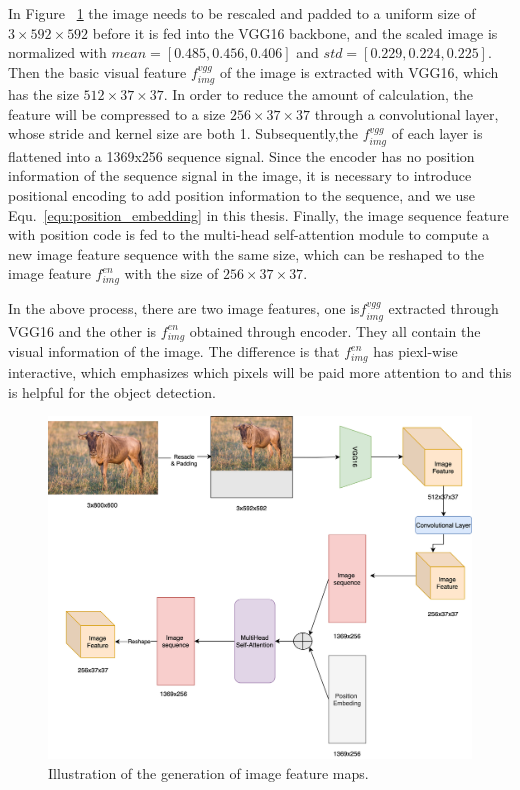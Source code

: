 In Figure ~\ref{fig:imgfeatbaseline} the image needs to be rescaled and padded to a uniform size of $ 3\times592\times592 $ before it is fed into the VGG16 backbone, and the scaled image is normalized with $ mean = [0.485, 0.456, 0.406 ]$ and $ std = [ 0.229, 0.224, 0.225]$. Then the basic visual feature $f^{vgg}_{img}$ of the image is extracted with VGG16, which has the size $512 \times 37 \times 37$. In order to reduce the amount of calculation, the feature will be compressed to a size $256 \times 37 \times 37$ through a convolutional layer, whose stride and kernel size are both 1. Subsequently,the $f^{vgg}_{img}$ of each layer is flattened  into a 1369x256 sequence signal. Since the encoder has no position information of the sequence signal in the image, it is necessary to introduce positional encoding to add position information to the sequence, and we use Equ.~\ref{equ:position_embedding} in this thesis. Finally, the image sequence feature with position code is fed to the multi-head self-attention module to compute a new image feature sequence with the same size, which can be reshaped to the image feature $f^{en}_{img}$ with the size of $256 \times 37 \times 37$.

In the above process, there are two image features, one is$f^{vgg}_{img}$ extracted through VGG16 and the other is $f^{en}_{img}$ obtained through encoder. They all contain the visual information of the image. The difference is that $f^{en}_{img}$ has piexl-wise interactive, which emphasizes which pixels will be paid more attention to and this is helpful for the object detection.


\begin{figure}[tbph!]
	\centering
	\includegraphics[width=0.9\linewidth]{figures/img_feat_baseline}
	\caption[Generation of Image Feature Map]{Illustration of the generation of image feature maps.}
	\label{fig:imgfeatbaseline}
\end{figure}


